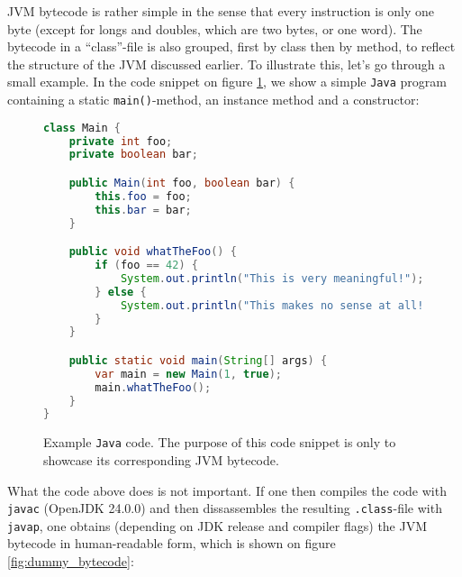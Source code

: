 JVM bytecode is rather simple in the sense that every instruction is only one byte (except for longs and doubles, which are two bytes, or one word).
The bytecode in a ``class''-file is also grouped, first by class then by method, to reflect the structure of the JVM discussed earlier.
To illustrate this, let's go through a small example. In the code snippet on figure \ref{fig:dummy_java_code}, we show a simple \texttt{Java} program containing a static
\texttt{main()}-method, an instance method and a constructor:

\begin{figure}[H]
\centering 
\begin{lstlisting}[language=Java]
class Main {
    private int foo;
    private boolean bar;

    public Main(int foo, boolean bar) {
        this.foo = foo;
        this.bar = bar;
    }

    public void whatTheFoo() {
        if (foo == 42) {
            System.out.println("This is very meaningful!");
        } else {
            System.out.println("This makes no sense at all!");
        }
    }

    public static void main(String[] args) {
        var main = new Main(1, true);
        main.whatTheFoo();
    }
}
\end{lstlisting}
\caption{Example \texttt{Java} code. The purpose of this code snippet is only to showcase its corresponding JVM bytecode.}
\label{fig:dummy_java_code}
\end{figure}

What the code above does is not important. If one then compiles the code with \texttt{javac} (OpenJDK 24.0.0) and then
dissassembles the resulting \texttt{.class}-file with \texttt{javap}, one obtains (depending on JDK release and compiler flags)
the JVM bytecode in human-readable form, which is shown on figure \ref{fig:dummy_bytecode}:

